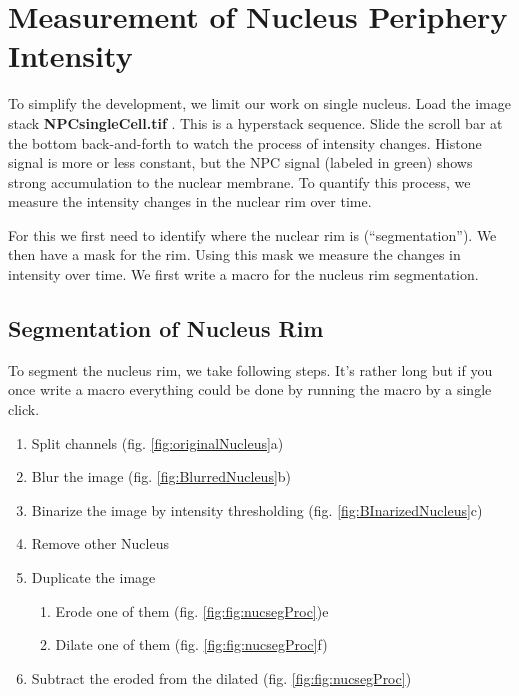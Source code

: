 \section{Measurement of Nucleus Periphery Intensity}

To simplify the development, we limit our work on single nucleus. Load the image stack \textbf{NPCsingleCell.tif} . This is a hyperstack sequence. Slide the scroll bar at the bottom back-and-forth to watch the process of intensity changes. Histone signal is more or less constant, but the NPC signal (labeled in green) shows strong accumulation to the nuclear membrane. To quantify this process, we measure the intensity changes in the nuclear rim over time.

For this we first need to identify where the nuclear rim is (``segmentation''). We then have a mask for the rim. Using this mask we measure the changes in intensity over time. We first write a macro for the nucleus rim segmentation.

\subsection{Segmentation of Nucleus Rim}

To segment the nucleus rim, we take following steps. It's rather long but if you once write a macro everything could be done by running the macro by a single click.

\begin{enumerate}
  \item Split channels (fig. \ref{fig:originalNucleus}a)
  \item Blur the image (fig. \ref{fig:BlurredNucleus}b)
  \item Binarize the image by intensity thresholding (fig. \ref{fig:BInarizedNucleus}c)
  \item Remove other Nucleus
  \item Duplicate the image
  \begin{enumerate}
    \item Erode one of them (fig. \ref{fig:fig:nucsegProc})e
    \item Dilate one of them (fig. \ref{fig:fig:nucsegProc}f)
  \end{enumerate}
  \item Subtract the eroded from the dilated (fig. \ref{fig:fig:nucsegProc})
\end{enumerate}